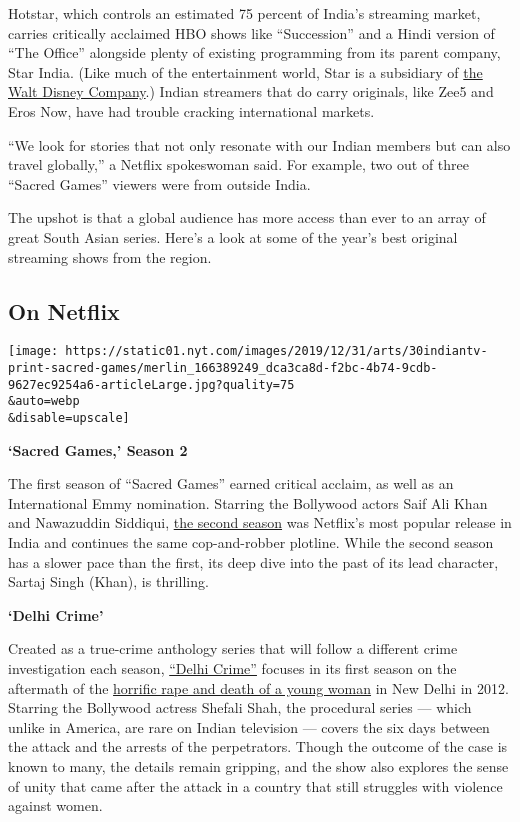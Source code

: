 Hotstar, which controls an estimated 75 percent of India's streaming
market, carries critically acclaimed HBO shows like ``Succession'' and a
Hindi version of ``The Office'' alongside plenty of existing programming
from its parent company, Star India. (Like much of the entertainment
world, Star is a subsidiary of
\href{https://www.nytimes.com/2019/03/20/business/media/walt-disney-21st-century-fox-deal.html}{the
Walt Disney Company}.) Indian streamers that do carry originals, like
Zee5 and Eros Now, have had trouble cracking international markets.

``We look for stories that not only resonate with our Indian members but
can also travel globally,'' a Netflix spokeswoman said. For example, two
out of three ``Sacred Games'' viewers were from outside India.

The upshot is that a global audience has more access than ever to an
array of great South Asian series. Here's a look at some of the year's
best original streaming shows from the region.

\hypertarget{on-netflix}{%
\subsection{On Netflix}\label{on-netflix}}

\texttt{[image: https://static01.nyt.com/images/2019/12/31/arts/30indiantv-print-sacred-games/merlin\_166389249\_dca3ca8d-f2bc-4b74-9cdb-9627ec9254a6-articleLarge.jpg?quality=75\\\&auto=webp\\\&disable=upscale]}

\textbf{`Sacred Games,' Season 2}

The first season of ``Sacred Games'' earned critical acclaim, as well as
an International Emmy nomination. Starring the Bollywood actors Saif Ali
Khan and Nawazuddin Siddiqui,
\href{https://www.youtube.com/watch?v=w-Xe8gLBc5I}{the second season}
was Netflix's most popular release in India and continues the same
cop-and-robber plotline. While the second season has a slower pace than
the first, its deep dive into the past of its lead character, Sartaj
Singh (Khan), is thrilling.

\textbf{`Delhi Crime'}

Created as a true-crime anthology series that will follow a different
crime investigation each season,
\href{https://www.youtube.com/watch?v=jNuKwlKJx2E}{``Delhi Crime''}
focuses in its first season on the aftermath of the
\href{https://www.nytimes.com/2012/12/29/world/asia/condition-worsens-for-victim-of-gang-rape-in-india.html}{horrific
rape and death of a young woman} in New Delhi in 2012. Starring the
Bollywood actress Shefali Shah, the procedural series --- which unlike
in America, are rare on Indian television --- covers the six days
between the attack and the arrests of the perpetrators. Though the
outcome of the case is known to many, the details remain gripping, and
the show also explores the sense of unity that came after the attack in
a country that still struggles with violence against women.

